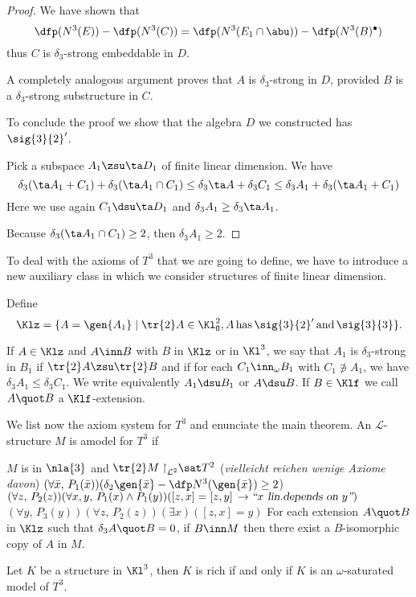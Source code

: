 \begin{proof}
We have shown that
$$\dfp(N^{3}(E))-\dfp(N^{3}(C))=\dfp(N^{3}(E_{1}\cap\abu))-\dfp(N^{3}(B)^{\bullet})$$
thus $C$ is $\delta_{3}$-strong embeddable in $D$.

A completely analogous argument proves that $A$ is $\delta_{3}$-strong in $D$,
provided $B$ is a $\delta_{3}$-strong substructure in $C$.

\smallskip
To conclude the proof we show that the algebra $D$ we constructed has $\sig{3}{2}^{\prime}$.

Pick a subspace $A_{1}\zsu\ta D_{1}$ of finite linear dimension. We have
$$
\delta_{3}(\ta A_{1}+C_{1})+\delta_{3}(\ta A_{1}\cap C_{1})
\leq\delta_{3}\ta A+\delta_{3}C_{1}\leq\delta_{3}A_{1}+\delta_{3}(\ta A_{1}+C_{1})
$$
Here we use again $C_{1}\dsu\ta D_{1}$ and $\delta_{3}A_{1}\geq\delta_{3}\ta A_{1}$.

Because $\delta_{3}(\ta A_{1}\cap C_{1})\geq2$, then $\delta_{3}A_{1}\geq2$.
\end{proof}
To deal with the axioms of $T^{3}$ that we are going to define, we have to introduce a new auxiliary
class in which we consider structures of finite linear dimension.

Define
$$\Klz=\{A=\gen{A_{1}}\mid\tr{2}A\in\Kl^{2}_\textsf{0},A\,\text{has}\,\sig{3}{2}^{\prime}\,\text{and}\,\sig{3}{3}\}.$$

If $A\in\Klz$ and $A\inn B$ with $B$ in $\Klz$ or in $\Kl^{3}$, we say that $A_{1}$
is $\delta_{3}$-strong in $B_{1}$ if $\tr{2}A\zsu\tr{2}B$ and if for each  $C_{1}\inn_{\omega}
B_{1}$ with $C_{1}\nni A_{1}$, we have $\delta_{3}A_{1}\leq\delta_{3}C_{1}$.
We write equivalently $A_{1}\dsu B_{1}$ or $A\dsu B$. If $B\in\Klf$ we call
$A\quot B$ a $\Klf$-extension.

We list now the axiom system for $T^{3}$ and enunciate the main theorem. An $\mathcal{L}$-structure
$M$ is amodel for $T^{3}$ if
\begin{itemize}
$M$ is in $\nla{3}$ and ${\tr{2}M\upharpoonright}_{\mathcal{L}^{2}}\sat T^{2}$ (\emph{vielleicht reichen wenige Axiome davon})
$(\forall \bar x,\,P_{1}(\bar x))(\delta_{2}\gen{\bar x}-\dfp N^{3}(\gen{\bar x})\geq2$)
$(\forall z,\,P_{2}(z))(\forall x,y,\,P_{1}(x)\wedge P_{1}(y))([z,x]=[z,y]\,\rightarrow
\textsl{``$x$ lin.{}depends on $y$''})$
$(\forall y,\,P_{3}(y))(\forall z,\,P_{2}(z))(\exists x)([z,x]=y)$
For each extension $A\quot B$ in $\Klz$ such that $\delta_{3}A\quot B=0$,
if $B\inn M$ then there exist a $B$-isomorphic copy of $A$ in $M$.
\end{itemize}
\begin{teo}\label{richmodel}
Let $K$ be a structure in $\Kl^{3}$, then $K$ is rich if and only if $K$ is an $\omega$-saturated model
of $T^{3}$.
\end{teo}

